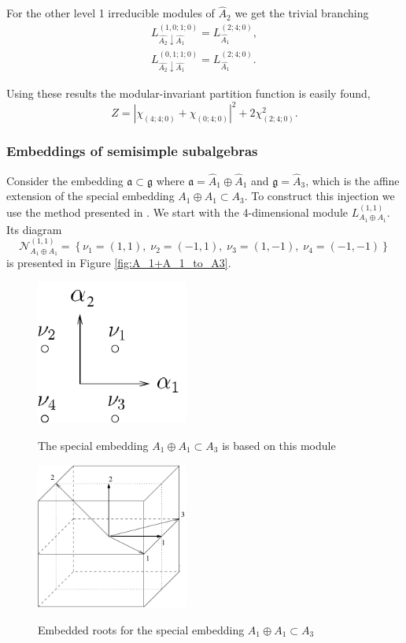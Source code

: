 \documentclass[a4paper,12pt]{article}
\theoremstyle{definition} \newtheorem{Def}{Definition}
\begin{document}
For the other level 1 irreducible modules of $\hat{A}_2$ we get the trivial
branching 
\begin{eqnarray}
  \label{eq:44}
   L^{(1,0;1;0)}_{\hat{A_2}\downarrow \hat{A_1}}= L_{\hat{A_1}}^{(2;4;0)},\\
   L^{(0,1;1;0)}_{\hat{A_2}\downarrow \hat{A_1}}= L_{\hat{A_1}}^{(2;4;0)}.
\end{eqnarray}

Using these results the modular-invariant partition function is easily found,
\begin{equation}
  \label{eq:45}
  Z=\left|\chi_{(4;4;0)}+\chi_{(0;4;0)}\right|^2+2\chi_{(2;4;0)}^2.
\end{equation}

\subsubsection{Embeddings of semisimple subalgebras}
\label{sec:embedd-semis-subalg}

Consider the embedding $\mathfrak{a}\subset \mathfrak{g}$ where
$\mathfrak{a}=\hat A_1\oplus \hat A_1$ and $\mathfrak{g}= \hat A_3$,
which is the affine extension of the special embedding $A_1\oplus A_1\subset A_3$.
To construct this injection we use the method presented in \cite{vasilevich1986method}.
We start with the 4-dimensional module $L_{A_1\oplus A_1}^{(1,1)}$. Its diagram
$$\mathcal{N}_{A_1\oplus A_1}^{(1,1)}= \left\{\nu_1=(1,1),\; \nu_2=(-1,1),\; \nu_3=(1,-1),\; \nu_4=(-1,-1)\right\}$$
is presented in Figure \ref{fig:A_1+A_1_to_A3}.

\begin{figure}[h!tb]
  \begin{multicols}{2}
    \hfill
    \includegraphics[width=50mm]{A_1+A_1_to_A3.pdf}
    \hfill
    \caption{The special embedding  $A_1\oplus A_1\subset A_3$ is based on this module}
    \label{fig:A_1+A_1_to_A3}
    \hfill
    \includegraphics[width=50mm]{A1+A1-A3.pdf}
    \hfill
    \caption{Embedded roots for the special embedding  $A_1\oplus A_1\subset A_3$}
    \label{fig:A1+A1-A3}
  \end{multicols}
\end{figure}
\end{document}
